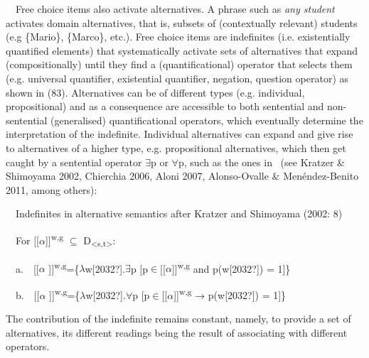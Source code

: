 \begin{styleStandard}
\ \ Free choice items also activate alternatives. A phrase such as \textit{any student} activates domain alternatives, that is, subsets of (contextually relevant) students (e.g \{Mario\}, \{Marco\}, etc.). Free choice items are indefinites (i.e. existentially quantified elements) that systematically activate sets of alternatives that expand (compositionally) until they find a (quantificational) operator that selects them (e.g. universal quantifier, existential quantifier, negation, question operator) as shown in (83). Alternatives can be of different types (e.g. individual, propositional) and as a consequence are accessible to both sentential and non-sentential (generalised) quantificational operators, which eventually determine the interpretation of the indefinite. Individual alternatives can expand and give rise to alternatives of a higher type, e.g. propositional alternatives, which then get caught by a sentential operator ${\exists}$p or ${\forall}$p, such as the ones in \ (see Kratzer \& Shimoyama 2002, Chierchia 2006, Aloni 2007, Alonso-Ovalle \& Menéndez-Benito 2011, among others):
\end{styleStandard}

\begin{styleStandard}
\label{bkm:Ref533761448}\ \ Indefinites in alternative semantics after Kratzer and Shimoyama (2002: 8)
\end{styleStandard}

\begin{styleStandard}
\ \ For [[$\alpha $]]\textsuperscript{w,g }${\subseteq}$ D\textsubscript{{\textless}s,t{\textgreater}}:
\end{styleStandard}

\begin{styleStandard}
\ \ a.\ \ [[$\alpha $ ]]\textsuperscript{w,g}=\{$\lambda $w[2032?].${\exists}$p [p${\in}$[[$\alpha $]]\textsuperscript{w,g} and p(w[2032?]) = 1]\}
\end{styleStandard}

\begin{styleStandard}
\ \ b.\ \ [[$\alpha $ ]]\textsuperscript{w,g}=\{$\lambda $w[2032?].${\forall}$p [p${\in}$[[$\alpha $]]\textsuperscript{w,g} → p(w[2032?]) = 1]\}
\end{styleStandard}

\begin{styleStandard}
The contribution of the indefinite remains constant, namely, to provide a set of alternatives, its different readings being the result of associating with different operators.
\end{styleStandard}

